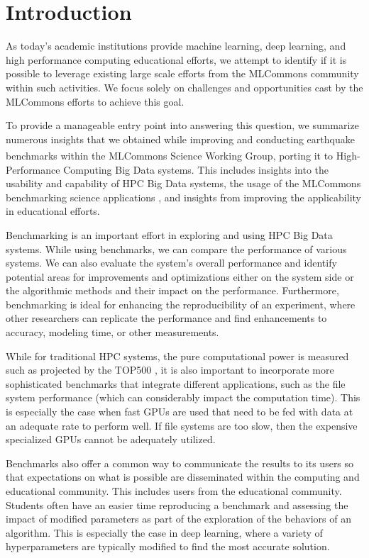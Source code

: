 
\section{Introduction}


As today's academic institutions provide machine learning, deep learning, and high performance computing educational efforts, we attempt to identify if it is possible to leverage 
existing large scale efforts from the MLCommons community within such activities\cite{www-mlcommons,las-22-mlcommons-science}. We focus solely on challenges and opportunities cast by the MLCommons efforts to achieve this goal.

To provide a manageable entry point into answering this question, we summarize numerous insights that we obtained while improving and conducting earthquake benchmarks within the MLCommons\textsuperscript{\texttrademark} Science Working Group, porting it to High-Performance Computing Big Data systems.  This includes insights into the usability and capability of HPC Big Data systems, the usage of the MLCommons benchmarking science applications \citep{las-22-mlcommons-science}, and insights from improving the applicability in educational efforts.

Benchmarking is an important effort in exploring and using HPC Big Data systems.  While using benchmarks, we can compare the performance of various systems. We can also evaluate the system's overall performance and identify potential areas for improvements and optimizations either on the system side or the algorithmic methods and their impact on the performance. Furthermore, benchmarking is ideal for enhancing the reproducibility of an experiment, where other researchers can replicate the performance and find enhancements to accuracy, modeling time, or other measurements.

While for traditional HPC systems, the pure computational power is measured such as projected by the TOP500 \cite{dongarra1997top500,www-top500}, it is also important to incorporate more sophisticated benchmarks that integrate different applications, such as the file system performance (which can considerably impact the computation time). This is especially the case when fast GPUs are used that need to be fed with data at an adequate rate to perform well. If file systems are too slow, then the expensive specialized GPUs cannot be adequately utilized.

Benchmarks also offer a common way to communicate the results to its users so that expectations on what is possible are disseminated within the computing and educational community. This includes users from the educational community. Students often have an easier time reproducing a benchmark and assessing the impact of modified parameters as part of the exploration of the behaviors of an algorithm. This is especially the case in deep learning, where a variety of hyperparameters are typically modified to find the most accurate solution.


